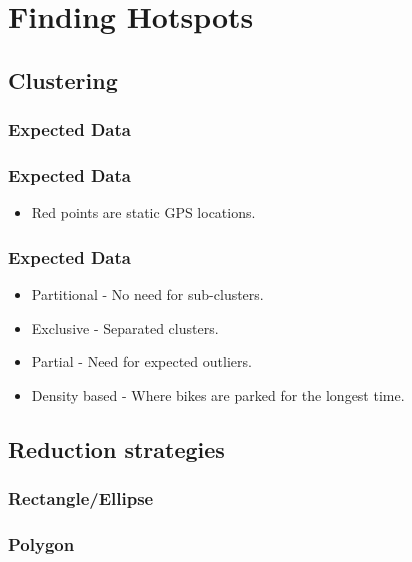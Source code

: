 \section{Finding Hotspots}

\subsection{Clustering}
\subsubsection{Expected Data}
\begin{frame}
\frametitle{Expected Data}
	\begin{itemize}
		\item Red points are static GPS locations.
	\end{itemize}
	
\end{frame}	
\begin{frame}
\frametitle{Expected Data}
	\begin{itemize}
		\item Partitional - No need for sub-clusters. %
		\item Exclusive - Separated clusters.
		\item Partial - Need for expected outliers.
		\item Density based - Where bikes are parked for the longest time.
	\end{itemize}
	
\end{frame}	

\subsection{Reduction strategies}
\subsubsection{Rectangle/Ellipse}
\subsubsection{Polygon}
